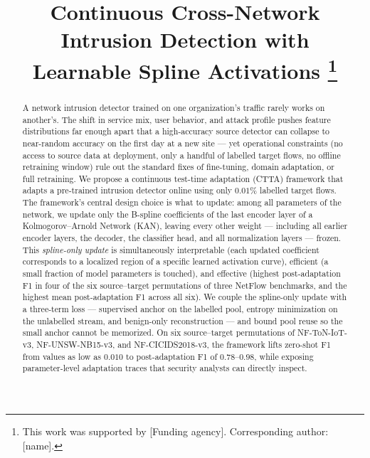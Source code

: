 \documentclass[10pt, conference, letterpaper]{IEEEtran}
\begin{document}
\title{Continuous Cross-Network Intrusion Detection with\\
Learnable Spline Activations
\thanks{This work was supported by [Funding agency]. Corresponding author: [name].}
}

\author{
}

\maketitle

\begin{abstract}
A network intrusion detector trained on one organization's traffic rarely works on another's. The shift in service mix, user behavior, and attack profile pushes feature distributions far enough apart that a high-accuracy source detector can collapse to near-random accuracy on the first day at a new site --- yet operational constraints (no access to source data at deployment, only a handful of labelled target flows, no offline retraining window) rule out the standard fixes of fine-tuning, domain adaptation, or full retraining. We propose a continuous test-time adaptation (CTTA) framework that adapts a pre-trained intrusion detector online using only $0.01\%$ labelled target flows. The framework's central design choice is what to update: among all parameters of the network, we update only the B-spline coefficients of the last encoder layer of a Kolmogorov--Arnold Network (KAN), leaving every other weight --- including all earlier encoder layers, the decoder, the classifier head, and all normalization layers --- frozen. This \emph{spline-only update} is simultaneously interpretable (each updated coefficient corresponds to a localized region of a specific learned activation curve), efficient (a small fraction of model parameters is touched), and effective (highest post-adaptation F1 in four of the six source--target permutations of three NetFlow benchmarks, and the highest mean post-adaptation F1 across all six). We couple the spline-only update with a three-term loss --- supervised anchor on the labelled pool, entropy minimization on the unlabelled stream, and benign-only reconstruction --- and bound pool reuse so the small anchor cannot be memorized. On six source--target permutations of NF-ToN-IoT-v3, NF-UNSW-NB15-v3, and NF-CICIDS2018-v3, the framework lifts zero-shot F1 from values as low as $0.010$ to post-adaptation F1 of $0.78$--$0.98$, while exposing parameter-level adaptation traces that security analysts can directly inspect.
\end{abstract}
\end{document}
